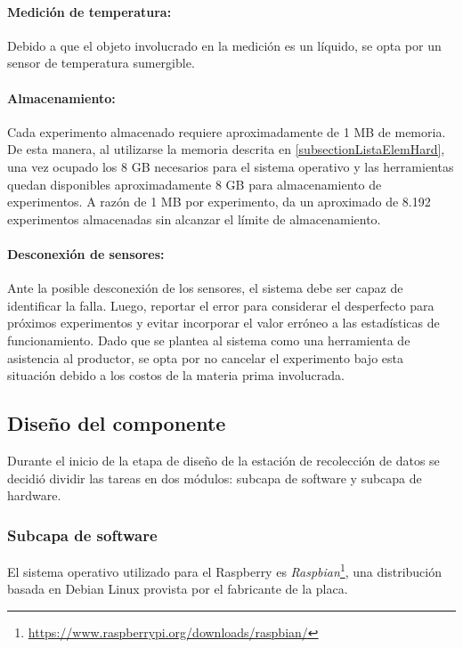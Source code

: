         \paragraph{Medición de temperatura:} 
            Debido a que el objeto involucrado en la medición es un líquido, se opta por un sensor de temperatura sumergible.
    
        \paragraph{Almacenamiento:} 
        Cada experimento almacenado requiere aproximadamente de 1 MB de memoria. De esta manera, al utilizarse la memoria descrita en \ref{subsectionListaElemHard}, una vez ocupado los 8 GB necesarios para el sistema operativo y las herramientas quedan disponibles aproximadamente 8 GB para almacenamiento de experimentos. A razón de 1 MB por experimento, da un aproximado de 8.192 experimentos almacenadas sin alcanzar el límite de almacenamiento. 
        
        \paragraph{Desconexión de sensores:} 
             Ante la posible desconexión de los sensores, el sistema debe ser capaz de identificar la falla. Luego, reportar el error para considerar el desperfecto para próximos experimentos y evitar incorporar el valor erróneo a las estadísticas de funcionamiento. Dado que se plantea al sistema como una herramienta de asistencia al productor, se opta por no cancelar el experimento bajo esta situación debido a los costos de la materia prima involucrada.
            
    \subsection{Diseño del componente}
            \par Durante el inicio de la etapa de diseño de la estación de recolección de datos se decidió dividir las tareas en dos módulos: subcapa de software y subcapa de hardware.
            
            \subsubsection{Subcapa de software}
                \par El sistema operativo utilizado para el Raspberry\textsuperscript{\textregistered} es \textit{Raspbian}\footnote{\url{https://www.raspberrypi.org/downloads/raspbian/}}, una distribución basada en Debian Linux provista por el fabricante de la placa.
                
